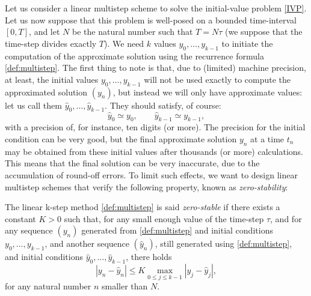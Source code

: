 \documentclass{article}
\begin{document}
Let us consider a linear multistep scheme to solve the initial-value problem \eqref{IVP}. Let us now suppose that this problem is well-posed on a bounded time-interval $[0,T]$, and let $N$ be the natural number such that $T=N\tau$ (we suppose that the time-step divides exactly $T$). 
We need $k$ values $y_0,\ldots,y_{k-1}$ to initiate the computation of the approximate solution using the recurrence formula \eqref{def:multistep}. 
The first thing to note is that, due to (limited) machine precision, at least, the initial values $y_0,\ldots,y_{k-1}$ will not be used exactly to compute the approximated solution $(y_n)$, but instead we will only have approximate values: let us call them $\hat y_0,\ldots,\hat y_{k-1}$. They should satisfy, of course:
\[
\hat y_0 \simeq y_0, \qquad \hat y_{k-1} \simeq y_{k-1},
\]
with a precision of, for instance, ten digits (or more). The precision for the initial condition can be very good, but the final approximate solution $y_n$ at a time $t_n$ may be obtained from these initial values after thousands (or more) calculations. This means that the final solution can be very inaccurate, due to the accumulation of round-off errors. To limit such effects, we want to design linear multistep schemes that verify the following property, known as \emph{zero-stability}:

\medskip

The linear k-step method \eqref{def:multistep} is said \emph{zero-stable} if there exists a constant $K>0$ such that, for any small enough value of the time-step $\tau$, and 
for any sequence $(y_n)$ generated from \eqref{def:multistep} and initial conditions 
$y_0,\ldots,y_{k-1}$, and another sequence $(\hat y_n)$, still generated using \eqref{def:multistep}, and initial conditions 
$\hat y_0,\ldots,\hat y_{k-1}$, there holds
\begin{equation} \label{eq:zero_stability}
    |y_n - \hat y_n| \leq K \max_{0\leq j \leq k-1} | y_j - \hat y_j |,
\end{equation}
for any natural number $n$ smaller than $N$. 

\medskip
\end{document}
